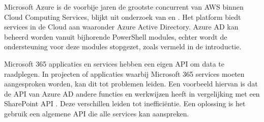 \begin{comment}
Azure biedt ondersteuning aan voor verschillende niet Microsoft-gerelateerde Infrastructure Automation tools. Configuration Management tools zoals Ansible, Chef en Puppet werden al onderzocht en onderling vergeleken in andere studies \autocite{Microsoft2022a}. 

Ansible biedt goede ondersteuning aan op \newline lange termijn en is simpel in gebruik met goede documentatie. Daarnaast is Ansible een krachtige tool met veel potentieel \autocite{Masek2018}. Het wordt eerder aangeraden voor kleinere projecten door zijn onvolledigheid. Waarbij Chef en Puppet meer compleet zijn en grote projecten beter kan verwerken \autocite{Bertram2016}. 

Naast bovenstaande tools ondersteunt Azure Orchestration tools waaronder Terraform. Deze tool is onveranderlijk ten opzichte van Configuration Management tools. Terraform wordt gebruikt om machines te orkestreren wat eenvoudiger is om meerdere instanties te voorzien. Terwijl Configuration Management tools zich focussen op het configureren van instanties \autocite{Brikman2016}.

Binnen Hogeschool Gent zijn er reeds een aantal studies uitgevoerd naar aspecten die voorkomen in dit onderwerp. Kelvin \textcite{Vermeulen2021} heeft een onderzoek uitgevoerd naar het automatiseren van een Public Cloud-omgeving binnen AWS. Daarnaast heeft Joachim \textcite{VandeKeere2021} een studie uitgevoerd naar het gebruik van Ansible binnen lokale omgevingen. 

In het eerste onderzoek van Vermeulen werd de configuratie van AWS manueel uitgevoerd. Vervolgens werd in het tweede onderzoek van Van der Keere Ansible gebruikt voor een lokale \newline Windows- en Linux-omgeving. In deze studie worden de configuraties van Azure geautomatiseerd. Verder wordt er een Linux-testomgeving opgezet in de Cloud via Ansible.

\end{comment}

Microsoft Azure is de voorbije jaren de grootste concurrent van AWS binnen Cloud Computing Services, blijkt uit onderzoek van \textcite{Vailshery2022} en \textcite{SRG2022}. Het platform biedt services in de Cloud aan waaronder Azure Active Directory. Azure AD kan beheerd worden vanuit bijhorende PowerShell modules, echter wordt de ondersteuning voor deze modules stopgezet, zoals vermeld in de introductie. 

Microsoft 365 applicaties en services hebben een eigen API om data te raadplegen. In projecten of applicaties waarbij  Microsoft 365 services moeten aangesproken worden, kan dit tot problemen leiden. Een voorbeeld hiervan is dat de API van Azure AD andere functies en werkwijzen heeft in vergelijking met een SharePoint API \autocite{VanRousselt2021}. Deze verschillen leiden tot inefficiëntie. Een oplossing is het gebruik een algemene API die alle services kan aanspreken.

